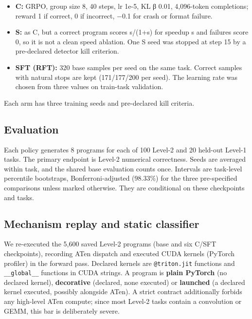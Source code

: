 \documentclass[11pt]{article}
\providecommand{\tightlist}{\setlength{\itemsep}{0pt}\setlength{\parskip}{0pt}}
\begin{document}
\begin{itemize}
\tightlist
\item
  \textbf{C:} GRPO, group size 8, 40 steps, lr 1e-5, KL β 0.01, 4,096-token completions;
  reward 1 if correct, 0 if incorrect, −0.1 for crash or format failure.
\item
  \textbf{S:} as C, but a correct program scores s/(1+s) for speedup s and failures score
  0, so it is not a clean speed ablation. One S
  seed was stopped at step 15 by a pre-declared detector kill criterion.
\item
  \textbf{SFT (RFT):} 320 base samples per seed on the same task. Correct samples with
  natural stops are kept (171/177/200 per seed). The learning rate was chosen from
  three values on train-task validation.
\end{itemize}

Each arm has three training seeds and pre-declared kill criteria.

\subsection{Evaluation}\label{evaluation}

Each policy generates 8 programs for each of 100 Level-2 and 20 held-out Level-1
tasks. The primary endpoint is Level-2 numerical correctness. Seeds are averaged
within task, and the shared base evaluation counts once. Intervals are task-level
percentile bootstraps, Bonferroni-adjusted (98.33\%) for the three pre-specified
comparisons unless marked otherwise. They are conditional on these checkpoints and
tasks.

\subsection{Mechanism replay and static classifier}\label{mechanism-replay-and-static-classifier}

We re-executed the 5,600 saved Level-2 programs (base and six C/SFT checkpoints),
recording ATen dispatch and executed CUDA kernels (PyTorch profiler) in the forward
pass. Declared kernels are \texttt{@triton.\allowbreak{}jit} functions and \texttt{\_\_\allowbreak{}global\_\_} functions in CUDA
strings. A program is \textbf{plain PyTorch} (no declared kernel), \textbf{decorative} (declared,
none executed) or \textbf{launched} (a declared kernel executed, possibly alongside ATen).
A strict contract additionally forbids any high-level ATen compute; since most Level-2
tasks contain a convolution or GEMM, this bar is deliberately severe.
\end{document}
